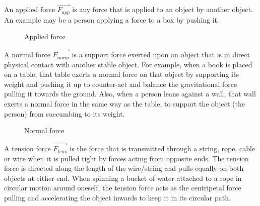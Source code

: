 

An applied force $\vec{F_{app}}$ is any force that is applied to an object by another object. An example may be a person applying a force to a box by pushing it.

\begin{figure}[h!]
	\centering
	\caption{Applied force}
\end{figure}


A normal force $\vec{F_{norm}}$ is a support force exerted upon an object that is in direct physical contact with another stable object. For example, when a book is placed on a table, that table exerts a normal force on that object by supporting its weight and pushing it up to counter-act and balance the gravitational force pulling it towards the ground. Also, when a person leans against a wall, that wall exerts a normal force in the same way as the table, to support the object (the person) from succumbing to its weight.

\begin{figure}[t!]
	\centering
    \caption{Normal force}
\end{figure}


A tension force $\vec{F_{tens}}$ is the force that is transmitted through a string, rope, cable or wire when it is pulled tight by forces acting from opposite ends. The tension force is directed along the length of the wire/string and pulls equally on both objects at either end. When spinning a bucket of water attached to a rope in circular motion around oneself, the tension force acts as the centripetal force pulling and accelerating the object inwards to keep it in its circular path.


